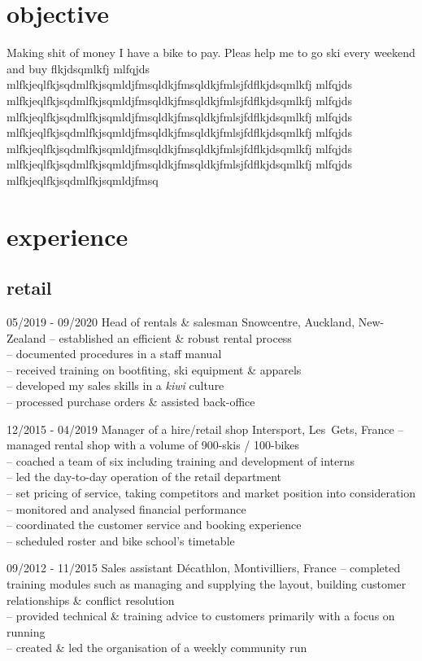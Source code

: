 \documentclass[a4paper]{farangoth-cv}
\begin{document}
\section{objective}
Making shit of money I have a bike to pay. Pleas help me to go ski every weekend and buy flkjdsqmlkfj mlfqjds mlfkjeqlfkjsqdmlfkjsqmldjfmsqldkjfmsqldkjfmlsjfdflkjdsqmlkfj mlfqjds mlfkjeqlfkjsqdmlfkjsqmldjfmsqldkjfmsqldkjfmlsjfdflkjdsqmlkfj mlfqjds mlfkjeqlfkjsqdmlfkjsqmldjfmsqldkjfmsqldkjfmlsjfdflkjdsqmlkfj mlfqjds mlfkjeqlfkjsqdmlfkjsqmldjfmsqldkjfmsqldkjfmlsjfdflkjdsqmlkfj mlfqjds mlfkjeqlfkjsqdmlfkjsqmldjfmsqldkjfmsqldkjfmlsjfdflkjdsqmlkfj mlfqjds mlfkjeqlfkjsqdmlfkjsqmldjfmsqldkjfmsqldkjfmlsjfdflkjdsqmlkfj mlfqjds mlfkjeqlfkjsqdmlfkjsqmldjfmsq
\section{experience}
\subsection{retail}
\begin{entrylist}
  \entry%
  {05/2019 \-- 09/2020}
  {Head of rentals \& salesman}
  {Snowcentre, \mbox{Auckland}, \mbox{New-Zealand}}
  {
    \--- established an efficient \& robust rental process\\
    \--- documented  procedures in a staff manual\\
    \--- received training on bootfiting, ski equipment \& apparels\\
    \--- developed my sales skills in a \emph{kiwi} culture\\
    \--- processed purchase orders \& assisted back-office
  }
  
  \entry%
  {12/2015 \-- 04/2019}
  {Manager of a hire/retail shop}
  {Intersport, \mbox{Les Gets}, \mbox{France}}
  {
    \--- managed rental shop with a volume of 900-skis / 100-bikes\\
    \--- coached a team of six including training and development of interns\\
    \--- led the day-to-day operation of the retail department\\
    \--- set pricing of service, taking competitors and market position into consideration\\
    \--- monitored and analysed financial performance\\
    \--- coordinated the customer service and booking experience\\
    \--- scheduled roster and bike school's timetable
  }

  \entry%
  {09/2012 \-- 11/2015}
  {Sales assistant}
  {Décathlon, \mbox{Montivilliers}, \mbox{France}}
  {%
    \--- completed training modules such as managing and supplying the layout, building customer relationships \& conflict resolution\\
    \--- provided technical \& training advice to customers primarily with a focus on running\\
    \--- created \& led the organisation of a weekly community run
  }
\end{entrylist}
\end{document}
